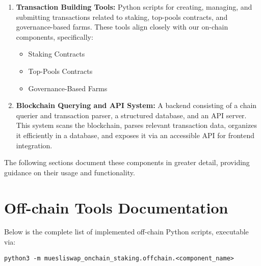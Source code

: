\documentclass{article}
\begin{document}
\begin{enumerate}[label=\alph*)]
    \item \textbf{Transaction Building Tools:} Python scripts for creating, managing, and submitting transactions related to staking, top-pools contracts, and governance-based farms. These tools align closely with our on-chain components, specifically:
    \begin{itemize}
        \item Staking Contracts
        \item Top-Pools Contracts
        \item Governance-Based Farms
    \end{itemize}

    \item \textbf{Blockchain Querying and API System:} A backend consisting of a chain querier and transaction parser, a structured database, and an API server. This system scans the blockchain, parses relevant transaction data, organizes it efficiently in a database, and exposes it via an accessible API for frontend integration.
\end{enumerate}

The following sections document these components in greater detail, providing guidance on their usage and functionality.

\section{Off-chain Tools Documentation}

Below is the complete list of implemented off-chain Python scripts, executable via:

\begin{verbatim}
python3 -m muesliswap_onchain_staking.offchain.<component_name>
\end{verbatim}
\end{document}
